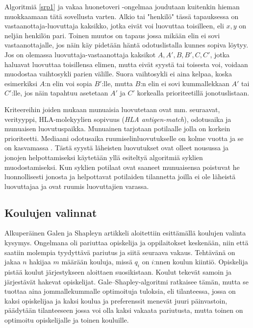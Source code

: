 \documentclass[finnish]{tktltiki2}
\theoremstyle{definition}
\theoremstyle{remark}
\begin{document}
Algoritmiä \ref{srp1} ja vakaa huonetoveri -ongelmaa joudutaan kuitenkin hieman muokkaamaan tätä sovellusta varten. Alkio tai "henkilö" tässä tapauksessa on vastaanottaja-luovuttaja kaksikko, jotka eivät voi luovuttaa toisilleen, eli ${x, y}$ on neljän henkilön pari. Toinen muutos on tapaus jossa mikään elin ei sovi vastaanottajalle, jos näin käy pidetään häntä odotuslistalla kunnes sopiva löytyy. Jos on olemassa luovuttaja-vastaanottaja kaksikot ${A, A'}, {B, B'}, {C, C'}$, jotka haluavat luovuttaa toisillensa elimen, mutta eivät syystä tai toisesta voi, voidaan muodostaa vaihtosykli parien välille. Suora vaihtosykli ei aina kelpaa, koska esimerkiksi $A$:n elin voi sopia $B'$:lle, mutta $B$:n elin ei sovi kummallekkaan $A'$ tai $C'$:lle, jos näin tapahtuu asetetaan $A'$ ja $C'$ korkealla prioriteetillä jonotuslistaan.

Kriteereihin joiden mukaan munuaisia luovutetaan ovat mm. seuraavat, verityyppi, HLA-molekyylien sopivuus (\emph{HLA antigen-match}), odotusaika ja munuaisen luovutuspaikka. Munuainen tarjotaan potilaalle jolla on korkein prioriteetti. Mediaani odotusaika ruumiselinluovutukselle on kolme vuotta ja se on kasvamassa \cite[s. 7]{NBERw10002}. Tästä syystä läheisten luovutukset ovat olleet nousussa ja jonojen helpottamiseksi käytetään yllä esiteltyä algoritmiä syklien muodostamiseksi. Kun syklien potilaat ovat saaneet munuaisensa poistuvat he luonnollisesti jonosta ja helpottavat potilaiden tilannetta joilla ei ole läheistä luovuttajaa ja ovat ruumis luovuttajien varassa.


\subsection{Koulujen valinnat}
Alkuperäinen Galen ja Shapleyn artikkeli \cite{gale62a} aloitettiin esittämällä koulujen valinta kysymys. Ongelmana oli pariuttaa opiskelija ja oppilaitokset keskenään, niin että saatiin molempia tyydyttävä pariutus ja siitä seuraava vakaus. Tehtävänä on jakaa $n$ hakijaa $m$ määrään kouluja, missä $q_{i}$ on $i$:nnen koulun kiintiö. Opiskelija pistää koulut järjestykseen aloittaen suosikistaan. Koulut tekevät samoin ja järjestävät hakevat opiskelijat. Gale--Shapley-algoritmi ratkaisee tämän, mutta se tuottaa aina jommallekummalle optimoituja tuloksia, eli tilanteessa, jossa on kaksi opiskelijaa ja kaksi koulua ja preferenssit menevät juuri päinvastoin, päädytään tilanteeseen jossa voi olla kaksi vakaata pariutusta, mutta toinen on optimoitu opiskelijalle ja toinen kouluille.
\end{document}

